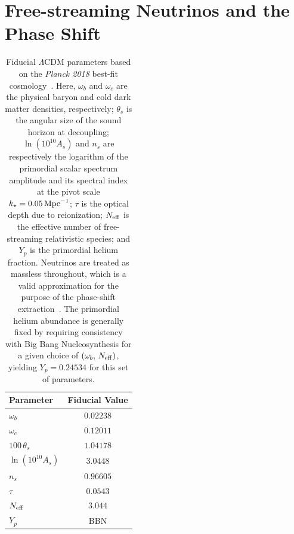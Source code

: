 \section{Free-streaming Neutrinos and the Phase Shift}
\label{sec:ch14-2}
\begin{table}
	\centering
	\begin{tabular}{l c}
			\toprule
		Parameter 				& Fiducial Value															\\
			\midrule[0.065em]
		$\omega_b$ 				& $0.02238$ 				 		\\
		$\omega_c$				& $0.12011$					\\
		$100\,\theta_s$ 		& $1.04178$ 						\\
		$\ln(10^{10}A_s)$		& $3.0448$							\\
		$n_s$					& $0.96605$ 													\\
		$\tau$ 					& $0.0543$ 									\\
		$N_{\rm eff}$					& $3.044$ 							\\
		$Y_p$					& BBN\\

			\bottomrule
	\end{tabular}
	\caption[Fiducial cosmological parameters for the 21-cm phase-shift analysis]{Fiducial $\Lambda$CDM parameters based on the {\it Planck 2018} best-fit cosmology~\cite{Planck:2018vyg}. Here, $\omega_b$ and $\omega_c$ are the physical baryon and cold dark matter densities, respectively; $\theta_s$ is the angular size of the sound horizon at decoupling; $\ln(10^{10}A_s)$ and $n_s$ are respectively the logarithm of the primordial scalar spectrum amplitude and its spectral index at the pivot scale $k_\star = 0.05\,{\rm Mpc}^{-1}$; $\tau$ is the optical depth due to reionization; $N_{\rm eff}$ is the effective number of free-streaming relativistic species; and $Y_p$ is the primordial helium fraction. Neutrinos are treated as massless throughout, which is a valid approximation for the purpose of the phase-shift extraction~\cite{Montefalcone:2025unv}. The primordial helium abundance is generally fixed by requiring consistency with Big Bang Nucleosynthesis for a given choice of $(\omega_b, \,N_{\rm eff})$, yielding $Y_p = 0.24534$ for this set of parameters.}
\label{tab:ch14-parameters}
\end{table}

